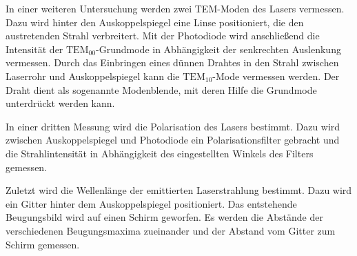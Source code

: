 In einer weiteren Untersuchung werden zwei TEM-Moden des Lasers vermessen.
Dazu wird hinter den Auskoppelspiegel eine Linse positioniert, die den
austretenden Strahl verbreitert. Mit der Photodiode wird anschließend die
Intensität der $\text{TEM}_{00}$-Grundmode in Abhängigkeit der senkrechten
Auslenkung vermessen. Durch das Einbringen eines dünnen Drahtes in den Strahl
zwischen Laserrohr und Auskoppelspiegel kann die $\text{TEM}_{10}$-Mode
vermessen werden. Der Draht dient als sogenannte Modenblende, mit deren Hilfe die
Grundmode unterdrückt werden kann.

In einer dritten Messung wird die Polarisation des Lasers bestimmt. Dazu wird
zwischen Auskoppelspiegel und Photodiode ein Polarisationsfilter gebracht und
die Strahlintensität in Abhängigkeit des eingestellten Winkels des Filters
gemessen.

Zuletzt wird die Wellenlänge der emittierten Laserstrahlung bestimmt. Dazu wird
ein Gitter hinter dem Auskoppelspiegel positioniert. Das entstehende
Beugungsbild wird auf einen Schirm geworfen. Es werden die Abstände der
verschiedenen Beugungsmaxima zueinander und der Abstand vom Gitter zum Schirm
gemessen.

